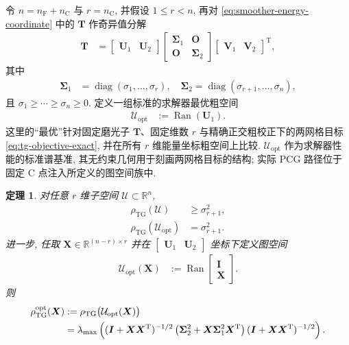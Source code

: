 \documentclass{ctexart}
\newcommand{\q}{\quad}
\newcommand{\T}{\mathrm{T}}
\newcommand{\R}{\mathbb{R}}
\renewcommand{\ge}{\geqslant}
\renewcommand{\le}{\leqslant}
\DeclareMathOperator{\diag}{diag}
\DeclareMathOperator{\Ran}{Ran}
\newtheorem{theorem}{定理}[section]
\begin{document}
令 $n=n_{\mathrm F}+n_{\mathrm C}$ 与 $r=n_{\mathrm C}$, 并假设 $1\le r<n$, 再对
\cref{eq:smoother-energy-coordinate} 中的 $\bm T$ 作奇异值分解
\begin{align}
    \bm T
    &=
    \begin{bmatrix}\bm U_1&\bm U_2\end{bmatrix}
    \begin{bmatrix}
      \bm\Sigma_1&\mathbf O\\
      \mathbf O&\bm\Sigma_2
    \end{bmatrix}
    \begin{bmatrix}\bm V_1&\bm V_2\end{bmatrix}^{\T},
    \label{eq:solver-optimal-svd}
\end{align}
其中
\begin{align}
    \bm\Sigma_1&=\diag(\sigma_1,\ldots,\sigma_r),\q
    \bm\Sigma_2=\diag(\sigma_{r+1},\ldots,\sigma_n),
    \label{eq:solver-optimal-sigma-blocks}
\end{align}
且 $\sigma_1\ge\cdots\ge\sigma_n\ge0$.
定义一组标准的求解器最优粗空间
\begin{align}
    \mathcal U_{\mathrm{opt}}
    &:=\Ran(\bm U_1).
    \label{eq:solver-optimal-space}
\end{align}
这里的“最优”针对固定磨光子 $\bm T$、固定维数 $r$ 与精确正交粗校正下的两网格目标
\cref{eq:tg-objective-exact}, 并在所有 $r$ 维能量坐标粗空间上比较. $\mathcal U_{\mathrm{opt}}$ 作为求解器性能的标准谱基准, 其无约束几何用于刻画两网格目标的结构; 实际 PCG 路径位于固定 C 点注入所定义的图空间族中.

\begin{theorem}
\label{thm:solver-optimal-space}
对任意 $r$ 维子空间 $\mathcal U\subset\R^n$,
\begin{align}
    \rho_{\mathrm{TG}}(\mathcal U)
    &\ge\sigma_{r+1}^2,
    \label{eq:solver-optimal-lower}\\
    \rho_{\mathrm{TG}}(\mathcal U_{\mathrm{opt}})
    &=\sigma_{r+1}^2.
    \label{eq:solver-optimal-attainment}
\end{align}
进一步, 任取
$\bm X\in\R^{(n-r)\times r}$ 并在
$\begin{bmatrix}\bm U_1&\bm U_2\end{bmatrix}$ 坐标下定义图空间
\begin{align}
    \mathcal U_{\mathrm{opt}}(\bm X)
    &:=
    \Ran\begin{bmatrix}\bm I\\\bm X\end{bmatrix}.
    \label{eq:solver-optimal-graph-space}
\end{align}
则
\begin{align}
    \rho_{\mathrm{TG}}^{\mathrm{opt}}(\bm X)
    &:=
    \rho_{\mathrm{TG}}\bigl(\mathcal U_{\mathrm{opt}}(\bm X)\bigr)\notag\\
    &=
    \lambda_{\max}\left(
      (\bm I+\bm X\bm X^\T)^{-1/2}
      \left(
        \bm\Sigma_2^2+\bm X\bm\Sigma_1^2\bm X^\T
      \right)
      (\bm I+\bm X\bm X^\T)^{-1/2}
    \right).
    \label{eq:solver-optimal-exact-graph}
\end{align}
\end{theorem}
\end{document}
